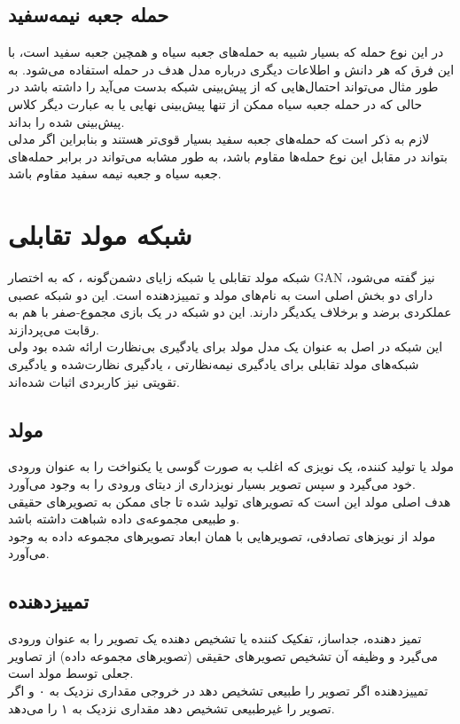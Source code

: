 \subsection{حمله جعبه نیمه‌سفید}
در این نوع حمله که بسیار شبیه به حمله‌های جعبه سیاه و همچین جعبه سفید است، با این فرق که هر دانش و اطلاعات دیگری درباره مدل هدف در حمله استفاده می‌شود. به طور مثال می‌تواند احتمال‌هایی که از پیش‌بینی شبکه بدست می‌آید را داشته باشد در حالی که در حمله جعبه سیاه ممکن از تنها پیش‌بینی نهایی یا به عبارت دیگر کلاس پیش‌بینی شده را بداند.
\\
لازم به ذکر است که حمله‌های جعبه سفید بسیار قوی‌تر هستند و بنابراین اگر مدلی بتواند در مقابل این نوع حمله‌ها مقاوم باشد، به طور مشابه می‌تواند در برابر حمله‌های جعبه سیاه و جعبه نیمه سفید مقاوم باشد.


\section{شبکه مولد تقابلی}
شبکه مولد تقابلی یا شبکه زایای دشمن‌گونه
 \cite{Goodfellow2014GenerativeAN}
، که به اختصار GAN نیز گفته می‌شود، دارای دو بخش اصلی است به نام‌های مولد 
و تمییزدهنده
است. این دو شبکه عصبی عملکردی برضد و برخلاف یکدیگر دارند. این دو شبکه در یک بازی مجموع-صفر
با هم به رقابت می‌پردازند.
\\
این شبکه در اصل به عنوان یک مدل مولد
  برای یادگیری بی‌نظارت 
ارائه شده بود ولی شبکه‌های مولد تقابلی برای یادگیری نیمه‌نظارتی
، یادگیری نظارت‌شده
و یادگیری تقویتی
نیز کاربردی اثبات شده‌اند.

\subsection{مولد}
مولد یا تولید کننده، یک نویزی که اغلب به صورت گوسی
 یا یکنواخت 
 را به عنوان ورودی خود می‌گیرد و سپس تصویر بسیار نویزداری از دیتای ورودی را به وجود می‌آورد.
\\
هدف اصلی مولد این است که تصویر‌های تولید شده تا جای ممکن به تصویر‌های حقیقی و طبیعی مجموعه‌ی داده شباهت داشته باشد.
\\
مولد از نویز‌های تصادفی، تصویر‌هایی با همان ابعاد تصویر‌های مجموعه داده به وجود می‌آورد.

\subsection{تمییز‌دهنده}
تمیز دهنده، جداساز، تفکیک کننده یا تشخیص دهنده یک تصویر را به عنوان ورودی می‌گیرد و وظیفه آن تشخیص تصویر‌های حقیقی (تصویر‌های مجموعه داده) از تصاویر جعلی توسط مولد است.
\\
تمییزدهنده اگر تصویر را طبیعی تشخیص دهد در خروجی مقداری نزدیک به ۰ و اگر تصویر را غیرطبیعی تشخیص دهد مقداری نزدیک به ۱ را می‌دهد.

